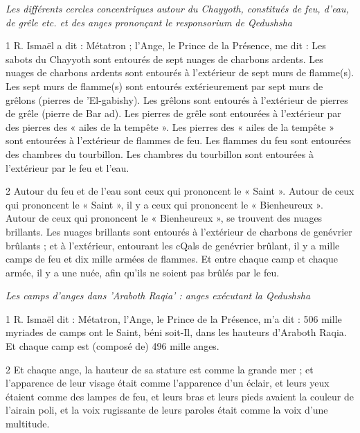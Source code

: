 
\par \textit{Les différents cercles concentriques autour du Chayyoth, constitués de feu, d'eau, de grêle etc. et des anges prononçant le responsorium de Qedushsha}

\par 1 R. Ismaël a dit : Métatron ; l'Ange, le Prince de la Présence, me dit : Les sabots du Chayyoth sont entourés de sept nuages ​​de charbons ardents. Les nuages ​​de charbons ardents sont entourés à l’extérieur de sept murs de flamme(s). Les sept murs de flamme(s) sont entourés extérieurement par sept murs de grêlons (pierres de 'El-gabishy). Les grêlons sont entourés à l'extérieur de pierres de grêle (pierre de Bar ad). Les pierres de grêle sont entourées à l'extérieur par des pierres des « ailes de la tempête ». Les pierres des « ailes de la tempête » sont entourées à l’extérieur de flammes de feu. Les flammes du feu sont entourées des chambres du tourbillon. Les chambres du tourbillon sont entourées à l’extérieur par le feu et l’eau.

\par 2 Autour du feu et de l'eau sont ceux qui prononcent le « Saint ». Autour de ceux qui prononcent le « Saint », il y a ceux qui prononcent le « Bienheureux ». Autour de ceux qui prononcent le « Bienheureux », se trouvent des nuages ​​brillants. Les nuages ​​brillants sont entourés à l'extérieur de charbons de genévrier brûlants ; et à l'extérieur, entourant les cQals de genévrier brûlant, il y a mille camps de feu et dix mille armées de flammes. Et entre chaque camp et chaque armée, il y a une nuée, afin qu'ils ne soient pas brûlés par le feu.


\par \textit{Les camps d'anges dans 'Araboth Raqia' : anges exécutant la Qedushsha}

\par 1 R. Ismaël dit : Métatron, l'Ange, le Prince de la Présence, m'a dit : 506 mille myriades de camps ont le Saint, béni soit-Il, dans les hauteurs d'Araboth Raqia. Et chaque camp est (composé de) 496 mille anges.

\par 2 Et chaque ange, la hauteur de sa stature est comme la grande mer ; et l'apparence de leur visage était comme l'apparence d'un éclair, et leurs yeux étaient comme des lampes de feu, et leurs bras et leurs pieds avaient la couleur de l'airain poli, et la voix rugissante de leurs paroles était comme la voix d'une multitude.

